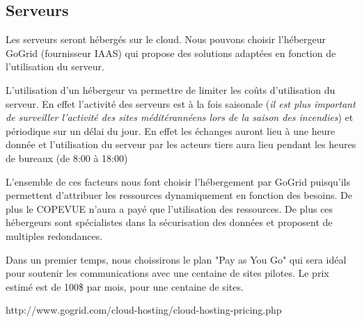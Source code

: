 \subsection{Serveurs}

Les serveurs seront hébergés sur le cloud. Nous pouvons choisir l'hébergeur GoGrid (fournisseur IAAS) 
qui propose des solutions adaptées en fonction de l'utilisation du serveur.

L'utilisation d'un hébergeur va permettre de limiter les coûts d'utilisation du serveur. 
En effet l'activité des serveurs est à la fois saisonale 
(\textit{il est plus important de surveiller l'activité des sites méditérannéens lors de la saison des incendies}) et
périodique sur un délai du jour. En effet les échanges auront lieu à une heure donnée et l'utilisation du serveur par les acteurs tiers aura lieu pendant les heures de bureaux (de 8:00 à 18:00)

L'ensemble de ces facteurs nous font choisir l'hébergement par GoGrid puisqu'ils permettent d'attribuer les ressources dynamiquement en fonction des besoins. De plus le COPEVUE n'aura a payé que l'utilisation des ressources. De plus ces hébergeurs sont spécialistes dans la sécurisation des données et proposent de multiples redondances. 

Dans un premier temps, nous choissirons le plan "Pay as You Go" qui sera idéal pour soutenir les communications avec une centaine de sites pilotes. 
Le prix estimé est de 100\$ par mois, pour une centaine de sites.

http://www.gogrid.com/cloud-hosting/cloud-hosting-pricing.php

